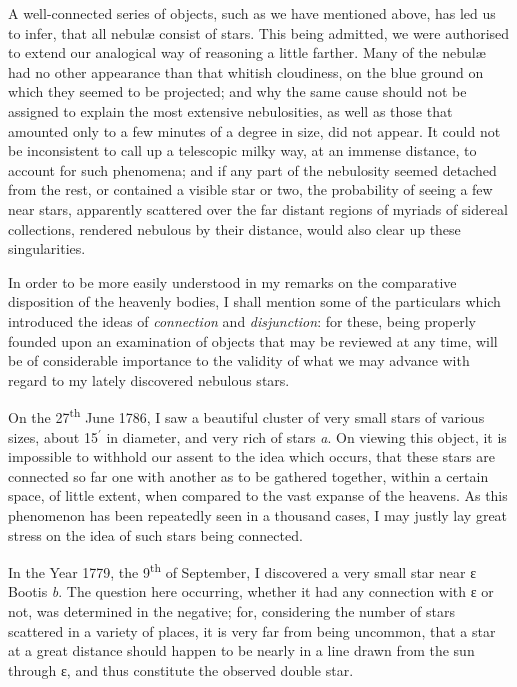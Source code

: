 \documentclass[a4paper, 12pt, oneside, polutonikogreek, english]{article}
\begin{document}
A well-connected series of objects, such as we have mentioned above, has led us to infer, that all nebulæ consist of stars. This being admitted, we were authorised to extend our analogical way of reasoning a little farther. Many of the nebulæ had no other appearance than that whitish cloudiness, on the blue ground on which they seemed to be projected; and why the same cause should not be assigned to explain the most extensive nebulosities, as well as those that amounted only to a few minutes of a degree in size, did not appear. It could not be inconsistent to call up a telescopic milky way, at an immense distance, to account for such phenomena; and if any part of the nebulosity seemed detached from the rest, or contained a visible star or two, the probability of seeing a few near stars, apparently scattered over the far distant regions of myriads of sidereal collections, rendered nebulous by their distance, would also clear up these singularities.

In order to be more easily understood in my remarks on the comparative disposition of the heavenly bodies, I shall mention some of the particulars which introduced the ideas of \emph{connection} and \emph{disjunction}: for these, being properly founded upon an examination of objects that may be reviewed at any time, will be of considerable importance to the validity of what we may advance with regard to my lately discovered nebulous stars.

On the 27\textsuperscript{th} June 1786, I saw a beautiful cluster of very small stars of various sizes, about 15$^{\prime}$ in diameter, and very rich of stars \emph{a}. On viewing this object, it is impossible to withhold our assent to the idea which occurs, that these stars are connected so far one with another as to be gathered together, within a certain space, of little extent, when compared to the vast expanse of the heavens. As this phenomenon has been repeatedly seen in a thousand cases, I may justly lay great stress on the idea of such stars being connected.

In the Year 1779, the 9\textsuperscript{th} of September, I discovered a very small star near ε Bootis \emph{b}. The question here occurring, whether it had any connection with ε or not, was determined in the negative; for, considering the number of stars scattered in a variety of places, it is very far from being uncommon, that a star at a great distance should happen to be nearly in a line drawn from the sun through ε, and thus constitute the observed double star.
\end{document}
